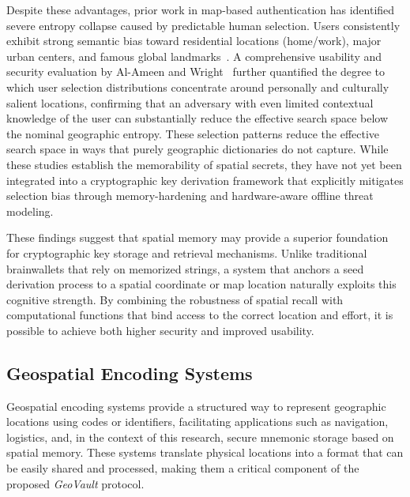 \documentclass[mathematics,article,accept,pdftex,moreauthors]{Definitions/mdpi}
\begin{document}
{Despite these advantages, prior work in map-based authentication has identified severe entropy collapse caused by predictable human selection. Users consistently exhibit strong semantic bias toward residential locations (home/work), major urban centers, and famous global landmarks~\cite{Sun2012, Thorpe2013, AlAmeen2014}. A comprehensive usability and security evaluation by Al-Ameen and Wright~\cite{AlAmeen2014} further quantified the degree to which user selection distributions concentrate around personally and culturally salient locations, confirming that an adversary with even limited contextual knowledge of the user can substantially reduce the effective search space below the nominal geographic entropy. These selection patterns reduce the effective search space in ways that purely geographic dictionaries do not capture. While these studies establish the memorability of spatial secrets, they have not yet been integrated into a cryptographic key derivation framework that explicitly mitigates selection bias through memory-hardening and hardware-aware offline threat modeling.}

{These findings suggest that spatial memory may provide a superior foundation for cryptographic key storage and retrieval mechanisms. Unlike traditional brainwallets that rely on memorized strings, a system that anchors a seed derivation process to a spatial coordinate or map location naturally exploits this cognitive strength. By combining the robustness of spatial recall with computational functions that bind access to the correct location and effort, it is possible to achieve both higher security and improved usability.}

\subsection{Geospatial Encoding Systems}

Geospatial encoding systems provide a structured way to represent geographic locations using codes or identifiers, facilitating applications such as navigation, logistics, and, in the context of this research, secure mnemonic storage based on spatial memory. These systems translate physical locations into a format that can be easily shared and processed, making them a critical component of the proposed \textit{GeoVault} protocol.
\end{document}
